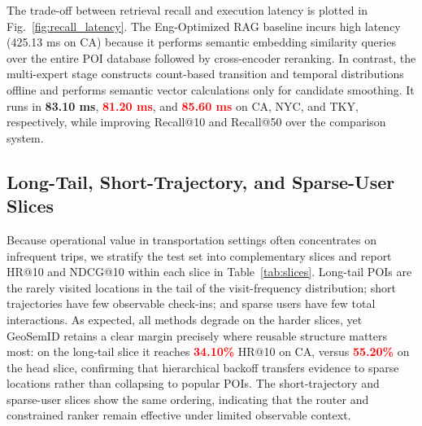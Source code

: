\documentclass[journal]{IEEEtran}
\newcommand{\mock}[1]{\textbf{\textcolor{red}{#1}}}
\begin{document}
The trade-off between retrieval recall and execution latency is plotted in Fig.~\ref{fig:recall_latency}. The Eng-Optimized RAG baseline incurs high latency (425.13 ms on CA) because it performs semantic embedding similarity queries over the entire POI database followed by cross-encoder reranking. In contrast, the multi-expert stage constructs count-based transition and temporal distributions offline and performs semantic vector calculations only for candidate smoothing. It runs in \textbf{83.10 ms}, \mock{81.20 ms}, and \mock{85.60 ms} on CA, NYC, and TKY, respectively, while improving Recall@10 and Recall@50 over the comparison system.

\subsection{Long-Tail, Short-Trajectory, and Sparse-User Slices}

Because operational value in transportation settings often concentrates on
infrequent trips, we stratify the test set into complementary slices and report
HR@10 and NDCG@10 within each slice in Table~\ref{tab:slices}. Long-tail POIs are
the rarely visited locations in the tail of the visit-frequency distribution;
short trajectories have few observable check-ins; and sparse users have few total
interactions. As expected, all methods degrade on the harder slices, yet
GeoSemID retains a clear margin precisely where reusable structure matters most:
on the long-tail slice it reaches \mock{34.10\%} HR@10 on CA, versus
\mock{55.20\%} on the head slice, confirming that hierarchical backoff transfers
evidence to sparse locations rather than collapsing to popular POIs. The
short-trajectory and sparse-user slices show the same ordering, indicating that
the router and constrained ranker remain effective under limited observable
context.
\end{document}
